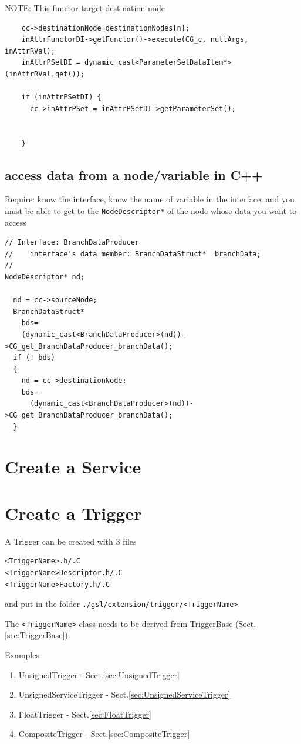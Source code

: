 NOTE: This functor target destination-node
\begin{lstlisting}
    cc->destinationNode=destinationNodes[n];
    inAttrFunctorDI->getFunctor()->execute(CG_c, nullArgs, inAttrRVal);
    inAttrPSetDI = dynamic_cast<ParameterSetDataItem*>(inAttrRVal.get());

    if (inAttrPSetDI) {
      cc->inAttrPSet = inAttrPSetDI->getParameterSet();
      
      
    }
\end{lstlisting}

\subsection{access data from a node/variable in C++}

Require: know the interface, know the name of variable in the interface; and you
must be able to get to the \verb!NodeDescriptor*! of the node whose data you
want to access
\begin{lstlisting}
// Interface: BranchDataProducer 
//    interface's data member: BranchDataStruct*  branchData;
// 
NodeDescriptor* nd;

  nd = cc->sourceNode;
  BranchDataStruct* 
    bds= 
    (dynamic_cast<BranchDataProducer>(nd))->CG_get_BranchDataProducer_branchData();
  if (! bds)
  {
    nd = cc->destinationNode;
    bds= 
      (dynamic_cast<BranchDataProducer>(nd))->CG_get_BranchDataProducer_branchData();
  }
\end{lstlisting}

\section{Create a Service}
\label{sec:Service-how-to-define}

\section{Create a Trigger}
\label{sec:Trigger-how-to-define}

A Trigger can be created with 3 files
\begin{verbatim}
<TriggerName>.h/.C
<TriggerName>Descriptor.h/.C
<TriggerName>Factory.h/.C
\end{verbatim}
and put in the folder \verb!./gsl/extension/trigger/<TriggerName>!.

The \verb!<TriggerName>! class needs to be derived from TriggerBase
(Sect.\ref{sec:TriggerBase}).

Examples 
\begin{enumerate}
  \item UnsignedTrigger - Sect.\ref{sec:UnsignedTrigger}
  \item UnsignedServiceTrigger - Sect.\ref{sec:UnsignedServiceTrigger}
  \item FloatTrigger - Sect.\ref{sec:FloatTrigger}
  \item CompositeTrigger - Sect.\ref{sec:CompositeTrigger}
\end{enumerate}


